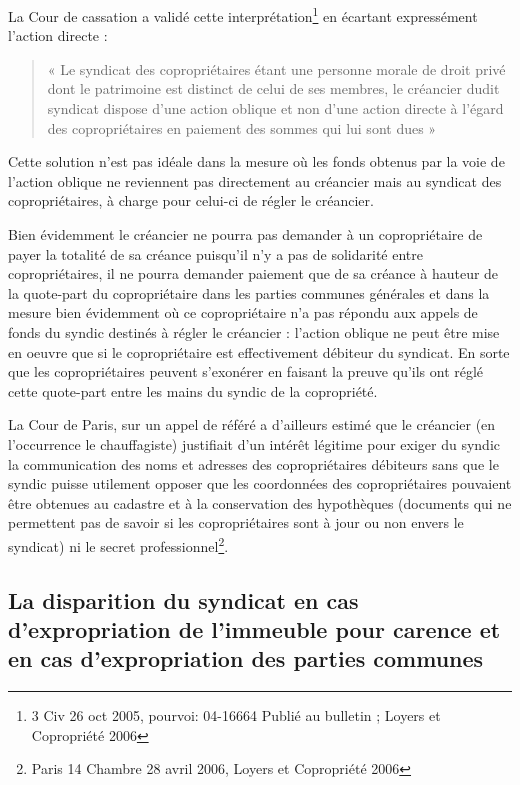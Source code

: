 			La Cour de cassation a validé cette interprétation\footnote{3\degre{} Civ 26 oct 2005, pourvoi: 04-16664 Publié au bulletin ; Loyers et Copropriété 2006 } en écartant expressément l’action directe :
			\begin{quote}
				« Le syndicat des copropriétaires étant une personne morale de droit privé dont le patrimoine est distinct de celui de ses membres, le créancier dudit syndicat dispose d’une action oblique et non d’une action directe à l’égard des copropriétaires en paiement des sommes qui lui sont dues »
			\end{quote}
			
			Cette solution n’est pas idéale dans la mesure où les fonds obtenus par la voie de l’action oblique ne reviennent pas directement au créancier mais au syndicat des copropriétaires, à charge pour celui-ci de régler le créancier.
			
			Bien évidemment le créancier ne pourra pas demander à un copropriétaire de payer la totalité de sa créance puisqu’il n’y a pas de solidarité entre copropriétaires, il ne pourra demander paiement que de sa créance à hauteur de la quote-part du copropriétaire dans les parties communes générales et dans la mesure bien évidemment où ce copropriétaire n’a pas répondu aux appels de fonds du syndic destinés à régler le créancier : l’action oblique ne peut être mise en oeuvre que si le copropriétaire est effectivement débiteur du syndicat. En sorte que les copropriétaires peuvent s’exonérer en faisant la preuve qu’ils ont réglé cette quote-part entre les mains du syndic de la copropriété.
			
			La Cour de Paris, sur un appel de référé a d’ailleurs estimé que le créancier (en l’occurrence le chauffagiste) justifiait d’un intérêt légitime pour exiger du syndic la communication des noms et adresses des copropriétaires débiteurs sans que le syndic puisse utilement opposer que les coordonnées des copropriétaires pouvaient être obtenues au cadastre et à la conservation des hypothèques (documents qui ne permettent pas de savoir si les copropriétaires sont à jour ou non envers le syndicat) ni le secret professionnel\footnote{Paris 14\degre{} Chambre 28 avril 2006, Loyers et Copropriété 2006 }.
	
	\subsection{La disparition du syndicat en cas d’expropriation de l’immeuble pour carence et en cas d’expropriation des parties communes}
	
